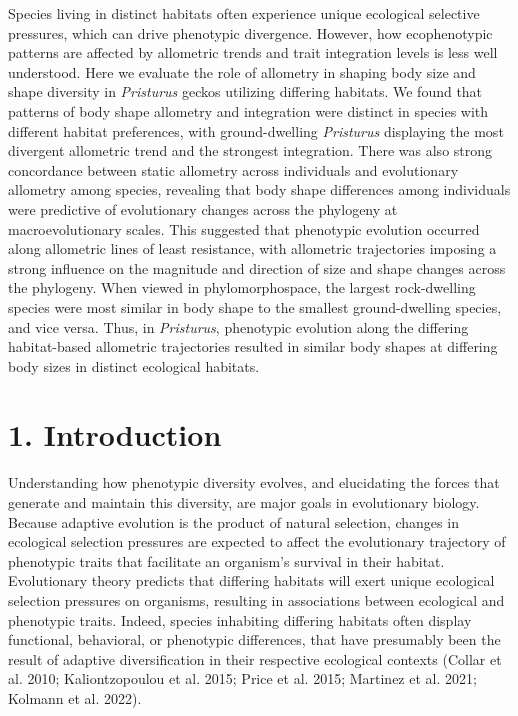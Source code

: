 \documentclass[
  11pt,
]{article}
\begin{document}
Species living in distinct habitats often experience unique ecological
selective pressures, which can drive phenotypic divergence. However, how
ecophenotypic patterns are affected by allometric trends and trait
integration levels is less well understood. Here we evaluate the role of
allometry in shaping body size and shape diversity in \emph{Pristurus}
geckos utilizing differing habitats. We found that patterns of body
shape allometry and integration were distinct in species with different
habitat preferences, with ground-dwelling \emph{Pristurus} displaying
the most divergent allometric trend and the strongest integration. There
was also strong concordance between static allometry across individuals
and evolutionary allometry among species, revealing that body shape
differences among individuals were predictive of evolutionary changes
across the phylogeny at macroevolutionary scales. This suggested that
phenotypic evolution occurred along allometric lines of least
resistance, with allometric trajectories imposing a strong influence on
the magnitude and direction of size and shape changes across the
phylogeny. When viewed in phylomorphospace, the largest rock-dwelling
species were most similar in body shape to the smallest ground-dwelling
species, and vice versa. Thus, in \emph{Pristurus}, phenotypic evolution
along the differing habitat-based allometric trajectories resulted in
similar body shapes at differing body sizes in distinct ecological
habitats.

\newpage

\hypertarget{introduction}{%
\section{1. Introduction}\label{introduction}}

Understanding how phenotypic diversity evolves, and elucidating the
forces that generate and maintain this diversity, are major goals in
evolutionary biology. Because adaptive evolution is the product of
natural selection, changes in ecological selection pressures are
expected to affect the evolutionary trajectory of phenotypic traits that
facilitate an organism's survival in their habitat. Evolutionary theory
predicts that differing habitats will exert unique ecological selection
pressures on organisms, resulting in associations between ecological and
phenotypic traits. Indeed, species inhabiting differing habitats often
display functional, behavioral, or phenotypic differences, that have
presumably been the result of adaptive diversification in their
respective ecological contexts (Collar et al. 2010; Kaliontzopoulou et
al. 2015; Price et al. 2015; Martinez et al. 2021; Kolmann et al. 2022).
\hfill\break
\end{document}
